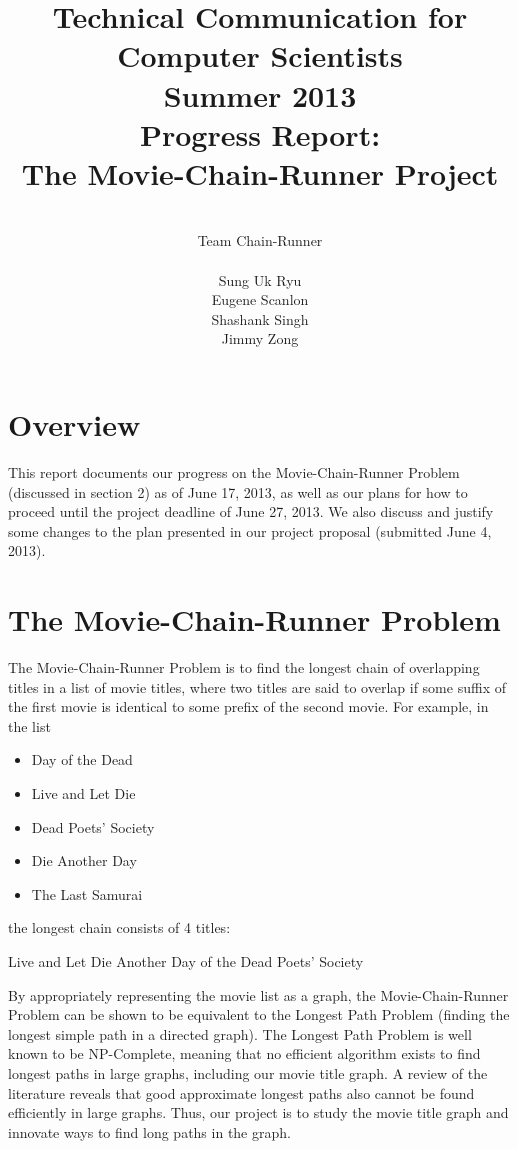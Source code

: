 \documentclass[11pt,english]{article}
\title{
{\normalsize \bf Technical Communication for Computer Scientists\\
Summer 2013}\\
\vspace{4cm}
{\bf Progress Report:\\The Movie-Chain-Runner Project}}
\author{
\\Team Chain-Runner \\\\
Sung Uk Ryu\\
Eugene Scanlon\\
Shashank Singh\\
Jimmy Zong
}
\begin{document}


\tableofcontents

\newpage
{} %
\section{Overview}
This report documents our progress on the Movie-Chain-Runner Problem
(discussed in section 2) as of June 17, 2013, as well as our plans for how to
proceed until the project deadline of June 27, 2013. We also discuss and
justify some changes to the plan presented in our project proposal
(submitted June 4, 2013).

\vspace{-0.2cm}
\section{The Movie-Chain-Runner Problem}
The Movie-Chain-Runner Problem is to find the longest chain of overlapping
titles in a list of movie titles, where two titles are said to overlap if some
suffix of the first movie is identical to some prefix of the second movie. For
example, in the list
\begin{itemize}[noitemsep]
\item Day of the Dead
\item Live and Let Die
\item Dead Poets' Society
\item Die Another Day
\item The Last Samurai
\end{itemize}
the longest chain consists of 4 titles:

\begin{center}
Live and Let Die Another Day of the Dead Poets' Society
\end{center}
By appropriately representing the movie list as a graph, the Movie-Chain-Runner
Problem can be shown to be equivalent to the Longest Path Problem (finding the
longest simple path in a directed graph). The Longest Path Problem is well
known to be NP-Complete, meaning that no efficient algorithm exists to find
longest paths in large graphs, including our movie title graph. A review of the
literature reveals that good approximate longest paths also cannot be found
efficiently in large graphs. Thus, our project is to study the movie title
graph and innovate ways to find long paths in the graph.
\end{document}
